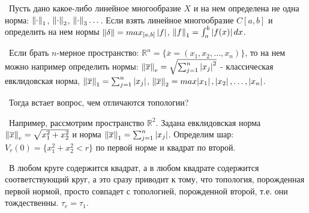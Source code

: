 \noindent \textbullet~Пусть дано какое-либо линейное многообразие $X$ и на нем определена не одна норма: $\left\lVert\cdot\right\rVert_1$, $\left\lVert\cdot\right\rVert_2$, $\left\lVert\cdot\right\rVert_3 \dots$.
Если взять линейное многообразие $C[a, b]$ и определить на нем нормы $\left\lVert\delta\right\rVert = max_{[a, b]} \left\lvert f\right\rvert$, $\left\lVert f\right\rVert_1 = \int_a^b \left\lvert f(x)\right\rvert dx$.

\smallskip
\noindent \textbullet~Если брать $n$-мерное пространство: $\mathbb{R}^n = \{ \overline{x} = (x_1, x_2, \dots, x_n)\}$, то на нем можно например определить нормы:
$\left\lVert\overline{x}\right\rVert_e = \sqrt{\sum_{j = 1}^n \left\lvert x_j\right\rvert^2}$ - классическая евклидовская норма, $\left\lVert\overline{x}\right\rVert_1 = \sum_{j = 1}^n \left\lvert x_j\right\rvert$, $\left\lVert\overline{x}\right\rVert_2 =
max{\left\lvert x_1\right\rvert, \left\lvert x_2\right\rvert, \dots, \left\lvert x_n\right\rvert}$.

\smallskip 
\noindent \textbullet~Тогда встает вопрос, чем отличаются топологии?


\smallskip
\noindent \textbullet~Например, рассмотрим пространство $\mathbb{R}^2$. Задана евклидовская норма $\left\lVert\overline{x}\right\rVert_e = \sqrt{x^2_1 + x^2_2}$ 
и норма $\left\lVert\overline{x}\right\rVert_1 = \sum_{j = 1}^n \left\lvert x_j\right\rvert$. Определим шар: $V_r(0) = \{ x_1^2 + x_2^2 < r\}$ по первой норме и квадрат по второй.


\noindent \textbullet~В любом круге содержится квадрат, а в любом квадрате содержится соответствующий круг, а это сразу приводит к тому, что топология, порожденная
первой нормой, просто совпадет с топологией, порожденной второй, т.е. они тождественны. $\tau_e = \tau_1$.

